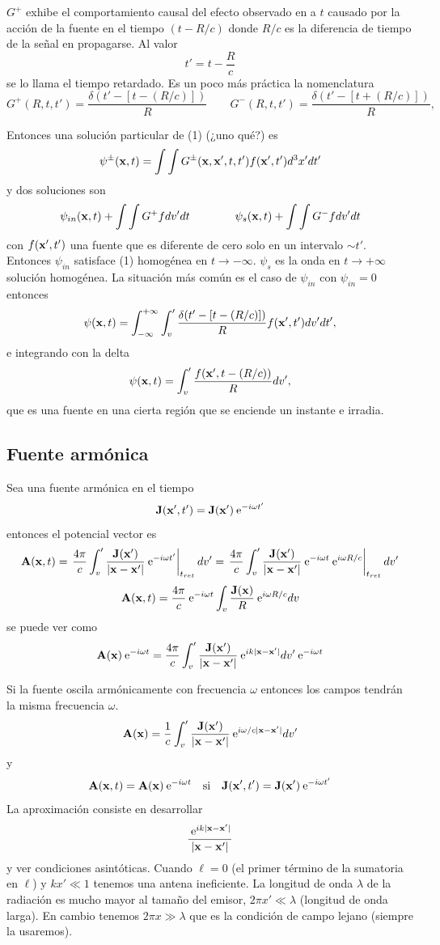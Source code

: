 \documentclass[10pt,oneside]{CBFT_book}
\begin{document}
$G^+$ exhibe el comportamiento causal del efecto observado en  a $t$ causado por la acción de la
fuente en el tiempo $(t-R/c)$ donde $R/c$ es la diferencia de tiempo de la señal en propagarse.
Al valor 
\[
	t' = t - \frac{R}{c}
\]
se lo llama el tiempo retardado. Es un poco más práctica la nomenclatura
\[
	G^+(R,t,t') = \frac{ \delta(t' - [ t - (R/c) ]) }{ R } 
	\qquad 
	G^-(R,t,t') = \frac{ \delta(t' - [ t + (R/c) ]) }{ R } ,
\]

Entonces una solución particular de (1) (¿uno qué?) es 
\[
	\psi^\pm (\vb{x},t) = \int \int G^{\pm}(\vb{x},\vb{x}',t,t') f(\vb{x}',t') d^3x' dt' 
\]
y dos soluciones son 
\[
	\psi_{in}(\vb{x},t) + \int\int G^+ f dv' dt \qquad \qquad \psi_{s}(\vb{x},t) + \int\int G^- f dv' dt
\]
con $f(\vb{x}',t')$ una fuente que es diferente de cero solo en un intervalo $\sim t'$. Entonces $\psi_{in}$ 
satisface (1) homogénea en $t \to -\infty$. $\psi_{s}$ es la onda en $t \to +\infty$ solución homogénea.
La situación más común es el caso de $\psi_{in}$ con $\psi_{in}=0$ entonces 
\[
	\psi (\vb{x},t) = \int_{-\infty}^{+\infty} \int_v' \frac{\delta(t'-[t -(R/c) ]) }{ R } 
			f(\vb{x}',t') dv' dt',
\]
e integrando con la delta
\[
	\psi (\vb{x},t) = \int_v' \frac{ f( \vb{x}', t -(R/c) ) }{ R } dv',
\]
que es una fuente en una cierta región que se enciende un instante e irradia.

\subsection{Fuente armónica}

Sea una fuente armónica en el tiempo 
\[
	\vb{J}(\vb{x}', t') = \vb{J}(\vb{x}') \euler^{-i\omega t'}
\]
entonces el potencial vector es 
\[
	\vb{A}(\vb{x}, t) = \left. \frac{4\pi}{c} \int_v' \frac{\vb{J}(\vb{x}')}{|\vb{x} - \vb{x}'|} 
	\euler^{-i\omega t'} \right|_{t_{ret}} dv' = \left. \frac{4\pi}{c} \int_v' 
	\frac{\vb{J}(\vb{x}')}{|\vb{x} - \vb{x}'|} \euler^{-i \omega t} \euler^{i \omega R/c } 
	\right|_{t_{ret}} dv'
\]
\[
	\vb{A}(\vb{x}, t) = \frac{4\pi}{c} \euler^{-i \omega t} \int_v \frac{\vb{J}(\vb{x})}{ R }
		\euler^{i \omega R/c } dv
\]
se puede ver como 
\[
	\vb{A}(\vb{x}) \euler^{-i \omega t} = \frac{4\pi}{c} \int_v' \frac{\vb{J}(\vb{x}')}{|\vb{x}-\vb{x}'|}
		\euler^{i k |\vb{x}-\vb{x}'| } dv' \euler^{-i \omega t}
\]

Si la fuente oscila armónicamente con frecuencia $\omega$ entonces los campos tendrán la misma frecuencia 
$\omega$.
\[
	\vb{A}(\vb{x}) = \frac{1}{c} \int_v' \frac{\vb{J}(\vb{x}')}{|\vb{x}-\vb{x}'|}
		\euler^{i \omega/c |\vb{x}-\vb{x}'| } dv'
\]
y 
\[
	\vb{A}(\vb{x},t) = \vb{A}(\vb{x}) \euler^{-i \omega t} \quad \text{si} \quad
		\vb{J}(\vb{x}',t') = \vb{J}(\vb{x}') \euler^{-i \omega t'}
\]
La aproximación consiste en desarrollar 
\[
	\frac{\euler^{i k |\vb{x}-\vb{x}'| }}{|\vb{x}-\vb{x}'|}
\]
y ver condiciones asintóticas. Cuando $\ell = 0$ (el primer término de la sumatoria en $\ell$) y
$ kx' \ll 1$ tenemos una antena ineficiente. La longitud de onda $\lambda$ de la radiación es mucho mayor al 
tamaño del emisor, $ 2\pi x' \ll \lambda$ (longitud de onda larga).
En cambio tenemos $ 2\pi x \gg \lambda$ que es la condición de campo lejano (siempre la usaremos).
\end{document}
